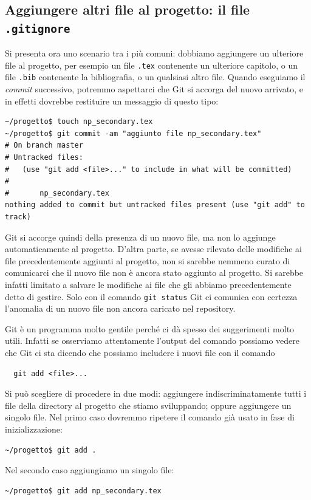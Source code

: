 \documentclass[a4paper,12pt,oneside]{article}
\begin{document}
\subsection{Aggiungere altri file al progetto: il file \lstinline|.gitignore|}
Si presenta ora uno scenario tra i più comuni: dobbiamo aggiungere un ulteriore
file al progetto, per esempio un file \lstinline|.tex| contenente un ulteriore
capitolo, o un file \lstinline|.bib| contenente la bibliografia, o un qualsiasi
altro file. Quando eseguiamo il \emph{commit} successivo, potremmo aspettarci
che Git si accorga del nuovo arrivato, e in effetti dovrebbe restituire un
messaggio di questo tipo:
\begin{lstlisting}
~/progetto$ touch np_secondary.tex
~/progetto$ git commit -am "aggiunto file np_secondary.tex"
# On branch master
# Untracked files:
#   (use "git add <file>..." to include in what will be committed)
#
#       np_secondary.tex
nothing added to commit but untracked files present (use "git add" to track)
\end{lstlisting}
Git si accorge quindi della presenza di un nuovo file, ma non lo aggiunge
automaticamente al progetto. D'altra parte, se avesse rilevato delle modifiche
ai file precedentemente aggiunti al progetto, non si sarebbe nemmeno curato di
comunicarci che il nuovo file non è ancora stato aggiunto al progetto. Si
sarebbe infatti limitato a salvare le modifiche ai file che gli abbiamo
precedentemente detto di gestire. Solo con il comando \lstinline|git status|
Git ci comunica con certezza l'anomalia di un nuovo file non ancora caricato nel
repository.

Git è un programma molto gentile perché ci dà spesso dei suggerimenti molto utili.
Infatti se osserviamo attentamente l'output del comando possiamo vedere che Git
ci sta dicendo che possiamo includere i nuovi file con il comando
\begin{lstlisting}
  git add <file>...
\end{lstlisting}
Si può scegliere di procedere in due modi:
aggiungere indiscriminatamente tutti i file della directory al progetto che
stiamo sviluppando; oppure aggiungere un singolo file. Nel primo caso dovremmo
ripetere il comando già usato in fase di inizializzazione:
\begin{lstlisting}
~/progetto$ git add .
\end{lstlisting}
Nel secondo caso aggiungiamo un singolo file:
\begin{lstlisting}
~/progetto$ git add np_secondary.tex
\end{lstlisting}
\end{document}
